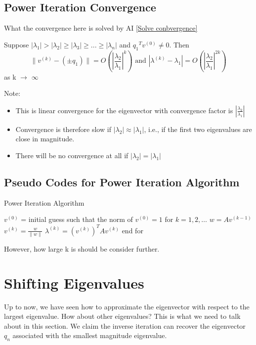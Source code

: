     \subsection{Power Iteration Convergence}
    What the convergence here is solved by AI \ref{Solve conbvergence}
    \begin{theorem}
        Suppose $|\lambda_1| > |\lambda_2| \geq |\lambda_3| \geq... \geq|\lambda_n| $ and ${q_1}^T v^{(0)} \neq 0$. Then \[\|v^{(k)} - (\pm q_1)\| = O (|\frac{\lambda_2}{\lambda_1}|^{k}) \text{ and } |\lambda^{(k)} - \lambda_1| = O(|\frac{\lambda_2}{\lambda_1}|^{2k})\] as k $\rightarrow$ $\infty$
    \end{theorem}
    Note:
    \begin{itemize}
        \item This is linear convergence for the eigenvector with convergence factor is $|\frac{\lambda_2}{\lambda_1}|$
        \item Convergence is therefore slow if $|\lambda_2| \approx |\lambda_1|$, i.e., if the first two eigenvalues are close in magnitude.
        \item There will be no convergence at all if $|\lambda_2| = |\lambda_1|$
    \end{itemize}
    
    \subsection{Pseudo Codes for Power Iteration Algorithm}
    \begin{algorithm}
    \caption{Power Iteration Algorithm}
    \begin{algorithmic}
        \STATE \( v^{(0)} \) = initial guess such that the norm of \( v^{(0)} = 1 \)
        \STATE for \( k = 1, 2, \dots \)
        \STATE \quad \( w = A v^{(k-1)} \)
        \STATE \quad \( v^{(k)} = \frac{w}{\|w\|} \)
        \STATE \quad \( \lambda^{(k)} = (v^{(k)})^T A v^{(k)} \)
        \STATE end for
    \end{algorithmic}
\end{algorithm}
However, how large k is should be consider further.

\section{Shifting Eigenvalues}
\label{Section Shifting Eigenvalues }
Up to now, we have seen how to approximate the eigenvector with respect to the largest eigenvalue. How about other eigenvalues? This is what we need to talk about in this section. We claim the inverse iteration can recover the eigenvector $q_n$ associated with the smallest magnitude eigenvalue.


